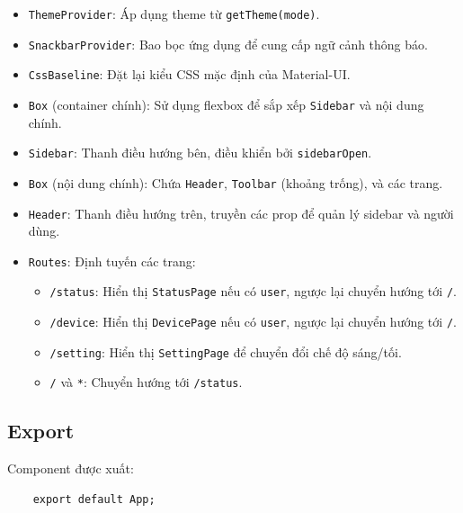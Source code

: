             \begin{itemize}
                \item \texttt{ThemeProvider}: Áp dụng theme từ \texttt{getTheme(mode)}.
                \item \texttt{SnackbarProvider}: Bao bọc ứng dụng để cung cấp ngữ cảnh thông báo.
                \item \texttt{CssBaseline}: Đặt lại kiểu CSS mặc định của Material-UI.
                \item \texttt{Box} (container chính): Sử dụng flexbox để sắp xếp \texttt{Sidebar} và nội dung chính.
                \item \texttt{Sidebar}: Thanh điều hướng bên, điều khiển bởi \texttt{sidebarOpen}.
                \item \texttt{Box} (nội dung chính): Chứa \texttt{Header}, \texttt{Toolbar} (khoảng trống), và các trang.
                \item \texttt{Header}: Thanh điều hướng trên, truyền các prop để quản lý sidebar và người dùng.
                \item \texttt{Routes}: Định tuyến các trang:
                \begin{itemize}
                    \item \texttt{/status}: Hiển thị \texttt{StatusPage} nếu có \texttt{user}, ngược lại chuyển hướng tới \texttt{/}.
                    \item \texttt{/device}: Hiển thị \texttt{DevicePage} nếu có \texttt{user}, ngược lại chuyển hướng tới \texttt{/}.
                    \item \texttt{/setting}: Hiển thị \texttt{SettingPage} để chuyển đổi chế độ sáng/tối.
                    \item \texttt{/} và \texttt{*}: Chuyển hướng tới \texttt{/status}.
                \end{itemize}
            \end{itemize}

        \subsection{Export}
            \hspace*{0.6cm}Component được xuất:
            \begin{lstlisting}
    export default App;
            \end{lstlisting}

